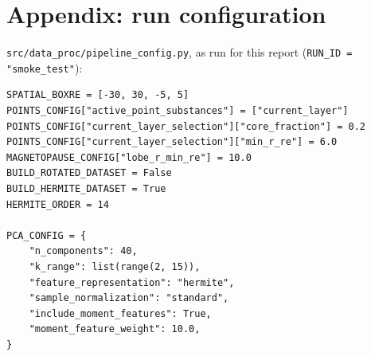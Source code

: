 \documentclass[11pt]{article}
\begin{document}
\section*{Appendix: run configuration}
\texttt{src/data\_proc/pipeline\_config.py}, as run for this report
(\texttt{RUN\_ID = "smoke\_test"}):
\begin{verbatim}
SPATIAL_BOXRE = [-30, 30, -5, 5]
POINTS_CONFIG["active_point_substances"] = ["current_layer"]
POINTS_CONFIG["current_layer_selection"]["core_fraction"] = 0.2
POINTS_CONFIG["current_layer_selection"]["min_r_re"] = 6.0
MAGNETOPAUSE_CONFIG["lobe_r_min_re"] = 10.0
BUILD_ROTATED_DATASET = False
BUILD_HERMITE_DATASET = True
HERMITE_ORDER = 14

PCA_CONFIG = {
    "n_components": 40,
    "k_range": list(range(2, 15)),
    "feature_representation": "hermite",
    "sample_normalization": "standard",
    "include_moment_features": True,
    "moment_feature_weight": 10.0,
}
\end{verbatim}
\end{document}
